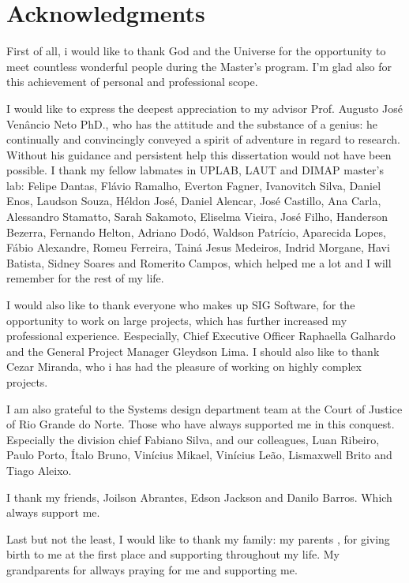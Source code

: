 
\chapter*{Acknowledgments}

First of all, i would like to thank God and the Universe for the opportunity to meet countless wonderful people during the Master's program. I'm glad also for this achievement of personal and professional scope.

I would like to express the deepest appreciation to my advisor Prof. Augusto José Venâncio Neto PhD., who has the attitude and the substance of a genius: he continually and convincingly conveyed a spirit of adventure in regard to research. Without his guidance and persistent help this dissertation would not have been possible. I thank my fellow labmates in UPLAB, LAUT and DIMAP master's lab: Felipe Dantas, Flávio Ramalho, Everton Fagner, Ivanovitch Silva, Daniel Enos, Laudson Souza, Héldon José, Daniel Alencar, José Castillo, Ana Carla, Alessandro Stamatto, Sarah Sakamoto, Eliselma Vieira, José Filho, Handerson Bezerra, Fernando Helton, Adriano Dodó, Waldson Patrício, Aparecida Lopes, Fábio Alexandre,  Romeu Ferreira, Tainá Jesus Medeiros, Indrid Morgane, Havi Batista, Sidney Soares and Romerito Campos, which helped me a lot and I will remember for the rest of my life. 

I would also like to thank everyone who makes up SIG Software, for the opportunity to work on large projects, which has further increased my professional experience. Eespecially,  Chief Executive Officer Raphaella Galhardo and the General Project Manager Gleydson Lima. I should also like to thank Cezar Miranda, who i has had the pleasure of working on highly complex projects.

I am also grateful to the Systems design department team at the Court of Justice of Rio Grande do Norte. Those who have always supported me in this conquest. Especially the division chief Fabiano Silva, and our colleagues, Luan Ribeiro, Paulo Porto, Ítalo Bruno, Vinícius Mikael, Vinícius Leão, Lismaxwell Brito and Tiago Aleixo.

I thank my friends, Joilson Abrantes, Edson Jackson and Danilo Barros. Which always support me.

Last but not the least, I would like to thank my family: my parents , for giving birth to me at the first place and supporting  throughout my life. My grandparents for allways praying for me and supporting me.
